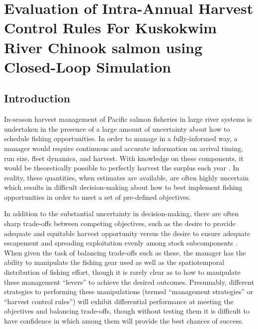 \documentclass[12pt,]{book}
\theoremstyle{definition}
\theoremstyle{definition}
\theoremstyle{definition}
\theoremstyle{remark}
\begin{document}
\setlength{\parskip}{0pt plus 0pt minus 0pt}

\doublespacing

\chapter{Evaluation of Intra-Annual Harvest Control Rules For Kuskokwim
River Chinook salmon using Closed-Loop Simulation}\label{ch3}

\section{Introduction}\label{introduction}

\noindent
In-season harvest management of Pacific salmon fisheries in large river
systems is undertaken in the presence of a large amount of uncertainty
about how to schedule fishing opportunities. In order to manage in a
fully-informed way, a manager would require continuous and accurate
information on arrival timing, run size, fleet dynamics, and harvest.
With knowledge on these components, it would be theoretically possible
to perfectly harvest the surplus each year
\citep{adkison-cunningham-2015}. In reality, these quantities, when
estimates are available, are often highly uncertain
\citep{adkison-peterman-2000, flynn-hilborn-2004, hyun-etal-2012} which
results in difficult decision-making about how to best implement fishing
opportunities in order to meet a set of pre-defined objectives.

In addition to the substantial uncertainty in decision-making, there are
often sharp trade-offs between competing objectives, such as the desire
to provide adequate and equitable harvest opportunity versus the desire
to ensure adequate escapement \citep{catalano-jones-2014} and spreading
exploitation evenly among stock subcomponents
\citep{carney-adkison-2014, adkison-cunningham-2015}. When given the
task of balancing trade-offs such as these, the manager has the ability
to manipulate the fishing gear used as well as the spatiotemporal
distribution of fishing effort, though it is rarely clear as to how to
manipulate these management ``levers'' to achieve the desired outcomes.
Presumably, different strategies to performing these manipulations
(termed ``management strategies'' or ``harvest control rules'') will
exhibit differential performance at meeting the objectives and balancing
trade-offs, though without testing them it is difficult to have
confidence in which among them will provide the best chances of success.
\end{document}

